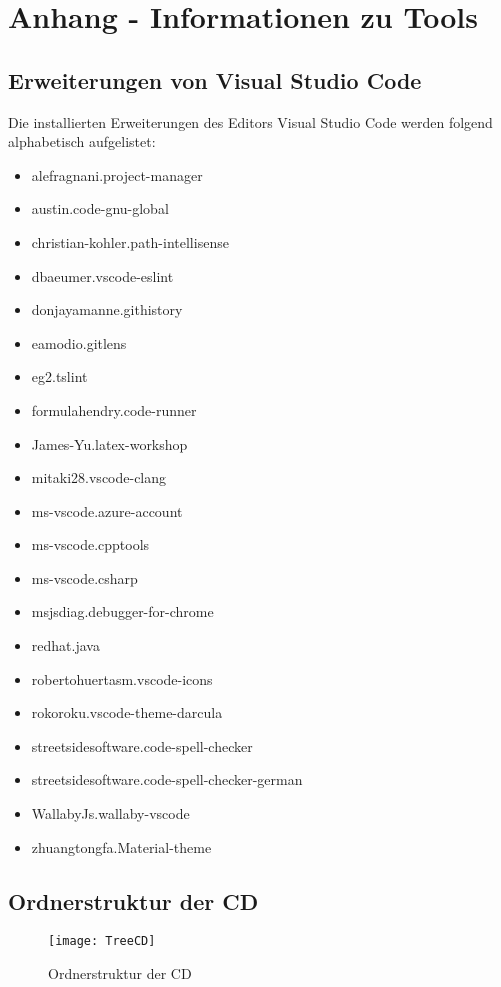 \chapter{Anhang - Informationen zu Tools}
\label{cha:Anhang_Info}

\section{Erweiterungen von Visual Studio Code}
\label{sec:extensions}
Die installierten Erweiterungen des Editors Visual Studio Code werden folgend alphabetisch aufgelistet: 
\begin{multicols}{2}
	\begin{itemize}
		\item alefragnani.project-manager
		\item austin.code-gnu-global
		\item christian-kohler.path-intellisense
		\item dbaeumer.vscode-eslint
		\item donjayamanne.githistory
		\item eamodio.gitlens
		\item eg2.tslint
		\item formulahendry.code-runner
		\item James-Yu.latex-workshop
		\item mitaki28.vscode-clang	
	\end{itemize}
	\columnbreak
	\begin{itemize}
		\item ms-vscode.azure-account
		\item ms-vscode.cpptools
		\item ms-vscode.csharp
		\item msjsdiag.debugger-for-chrome
		\item redhat.java
		\item robertohuertasm.vscode-icons
		\item rokoroku.vscode-theme-darcula
		\item streetsidesoftware.code-spell-checker
		\item streetsidesoftware.code-spell-checker-german
		\item WallabyJs.wallaby-vscode
		\item zhuangtongfa.Material-theme
	\end{itemize}
\end{multicols}

\section{Ordnerstruktur der CD}
\label{sec:treeCD}

\begin{figure}[htp]
	\centering
	\captionsetup{justification=centering}
	\texttt{[image: TreeCD]}
	\caption[Ordnerstruktur CD]{Ordnerstruktur der CD}
	\label{fig:TreeCD}
\end{figure}